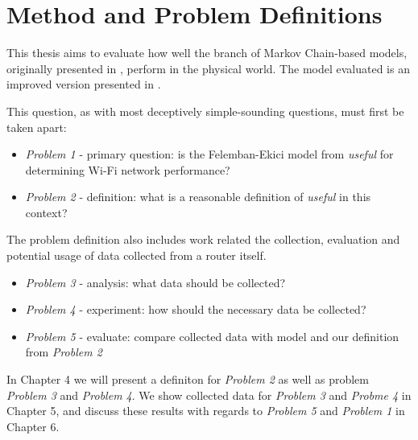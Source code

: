 \section{Method and Problem Definitions}

This thesis aims to evaluate how well the branch of Markov Chain-based models,
originally presented in \cite{bianchi}, perform in the physical world. The
model evaluated is an improved version presented in \cite{felemban}.

This question, as with most deceptively simple-sounding questions, must first
be taken apart:

\begin{itemize}

\item \emph{Problem 1} - primary question: is the Felemban-Ekici model from
\cite{felemban} \emph{useful} for determining Wi-Fi network performance?

\item \emph{Problem 2} - definition: what is a reasonable definition of
\emph{useful} in this context?

\end{itemize}

The problem definition also includes work related the collection, evaluation
and potential usage of data collected from a router itself.

\begin{itemize}
\item \emph{Problem 3} - analysis: what data should be collected?
\item \emph{Problem 4} - experiment: how should the necessary data be collected?
\item \emph{Problem 5} - evaluate: compare collected data with model and our definition from \emph{Problem 2}
\end{itemize}

In Chapter 4 we will present a definiton for \emph{Problem 2} as well as
problem \emph{Problem 3} and \emph{Problem 4}. We show collected data for
\emph{Problem 3} and \emph{Probme 4} in Chapter 5, and discuss these results
with regards to \emph{Problem 5} and \emph{Problem 1} in Chapter 6.

